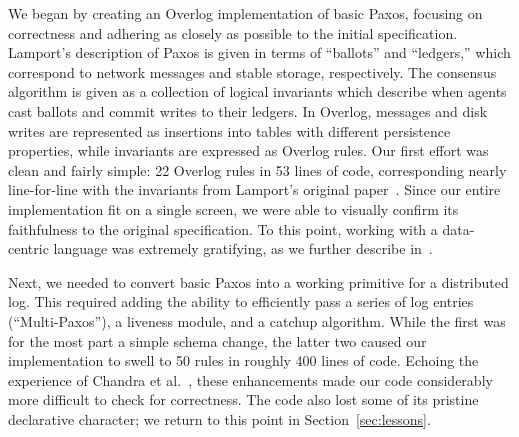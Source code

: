 
We began by creating an Overlog implementation of basic Paxos, focusing on
correctness and adhering as closely as possible to the initial
specification. Lamport's description of Paxos is given in terms of ``ballots''
and ``ledgers,'' which correspond to network messages and stable storage,
respectively. The consensus algorithm is given as a collection of logical
invariants which describe when agents cast ballots and commit writes to
their ledgers.  In Overlog, messages and disk writes are represented as
insertions into tables with different persistence properties, while invariants
are expressed as Overlog rules.  Our first effort was clean and fairly simple:
22 Overlog rules in 53 lines of code, corresponding nearly line-for-line with
the invariants from Lamport's original paper~\cite{part-time}.  Since our entire
implementation fit on a single screen, we were able to visually confirm its
faithfulness to the original specification.  To this point, working with a
data-centric language was extremely gratifying, as we further describe
in~\cite{netdb-declare}.

Next, we needed to convert basic Paxos into a working primitive for a
distributed log.  This required adding the ability to efficiently pass a series of log
entries (``Multi-Paxos''), a liveness module, and a catchup algorithm. While the
first was for the most part a simple schema change, the latter two caused our
implementation to swell to 50 rules in roughly 400 lines of code. Echoing the experience of
Chandra et al.~\cite{paxos-live}, these enhancements made our code considerably
more difficult to check for correctness. The code also lost some of its pristine
declarative character; we return to this point in Section~\ref{sec:lessons}.

